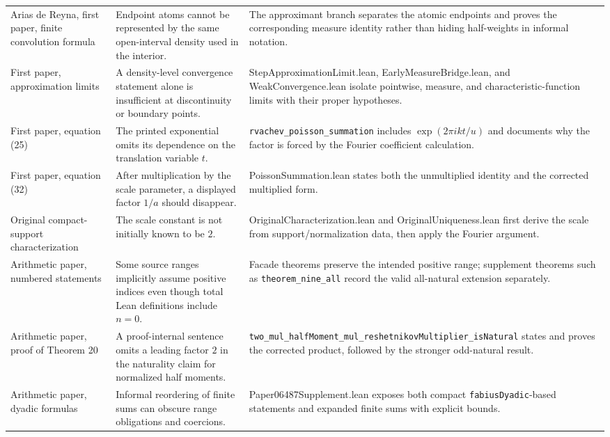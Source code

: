 \documentclass[11pt,a4paper,openany]{book}
\def\module#1{#1.lean}
\newcommand{\module}[1]{\nolinkurl{#1.lean}}
\newcommand{\pathbreak}[1]{\nolinkurl{#1}}
\begin{document}
\begin{longtable}{@{}>{\raggedright\arraybackslash}p{}>{\raggedright\arraybackslash}p{}p{}@{}}
Arias de Reyna, first paper, finite convolution formula & Endpoint atoms cannot be represented by the same open-interval density used in the interior. & The approximant branch separates the atomic endpoints and proves the corresponding measure identity rather than hiding half-weights in informal notation. \\
\addlinespace[.35em]
First paper, approximation limits & A density-level convergence statement alone is insufficient at discontinuity or boundary points. & \module{StepApproximationLimit}, \module{EarlyMeasureBridge}, and \module{WeakConvergence} isolate pointwise, measure, and characteristic-function limits with their proper hypotheses. \\
\addlinespace[.35em]
First paper, equation (25) & The printed exponential omits its dependence on the translation variable $t$. & \pathbreak{rvachev_poisson_summation} includes $\exp(2\pi i k t/u)$ and documents why the factor is forced by the Fourier coefficient calculation. \\
\addlinespace[.35em]
First paper, equation (32) & After multiplication by the scale parameter, a displayed factor $1/a$ should disappear. & \module{PoissonSummation} states both the unmultiplied identity and the corrected multiplied form. \\
\addlinespace[.35em]
Original compact-support characterization & The scale constant is not initially known to be $2$. & \module{OriginalCharacterization} and \module{OriginalUniqueness} first derive the scale from support/normalization data, then apply the Fourier argument. \\
\addlinespace[.35em]
Arithmetic paper, numbered statements & Some source ranges implicitly assume positive indices even though total Lean definitions include $n=0$. & Facade theorems preserve the intended positive range; supplement theorems such as \pathbreak{theorem_nine_all} record the valid all-natural extension separately. \\
\addlinespace[.35em]
Arithmetic paper, proof of Theorem 20 & A proof-internal sentence omits a leading factor $2$ in the naturality claim for normalized half moments. & \pathbreak{two_mul_halfMoment_mul_reshetnikovMultiplier_isNatural} states and proves the corrected product, followed by the stronger odd-natural result. \\
\addlinespace[.35em]
Arithmetic paper, dyadic formulas & Informal reordering of finite sums can obscure range obligations and coercions. & \module{Paper06487Supplement} exposes both compact \pathbreak{fabiusDyadic}-based statements and expanded finite sums with explicit bounds. \\

\end{longtable}
\end{document}
